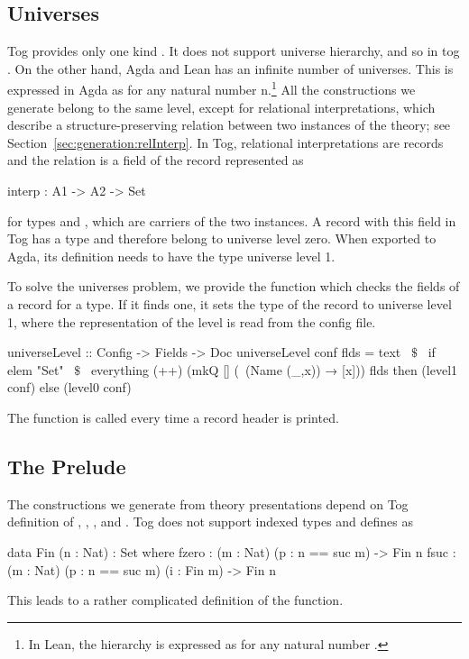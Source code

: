 \subsection{Universes}
Tog provides only one kind . It does not support universe hierarchy, and so in tog . On the other hand, Agda and Lean has an infinite number of universes. This is expressed in Agda as 
 for any natural number $\text{n}$.\footnote{In Lean, the hierarchy is expressed as  for any natural number .}
All the constructions we generate belong to the same level, except for relational interpretations, which describe a structure-preserving relation between two instances of the theory; see Section~\ref{sec:generation:relInterp}. In Tog, relational interpretations are records and the relation is a field of the record represented as 
\begin{togcode}
interp : A1 -> A2 -> Set
\end{togcode}
\noindent for types  and , which are carriers of the two instances. 
A record with this field in Tog has a type  and therefore belong to universe level zero. When exported to Agda, its definition needs to have the type universe level 1.  

To solve the universes problem, we provide the function  which checks the fields of a record for a  type. If it finds one, it sets the type of the record to universe level 1, where the representation of the level is read from the config file. 
\begin{hscode}
universeLevel :: Config -> Fields -> Doc
universeLevel conf flds =
  text ~$\$$~
    if elem "Set" ~$\$$~ everything (++) (mkQ [] (\ (Name (_,x)) → [x])) flds
    then (level1 conf) else (level0 conf)    
\end{hscode}
The function  is called every time a record header is printed. 

\subsection{The Prelude}
The constructions we generate from theory presentations depend on Tog definition of , , , and . Tog does not support indexed types and defines  as  
\begin{togcode}
data Fin (n : Nat) : Set where
  fzero : (m : Nat) (p : n == suc m) -> Fin n
  fsuc  : (m : Nat) (p : n == suc m) (i : Fin m) -> Fin n
\end{togcode}
\noindent This leads to a rather complicated definition of the  function. 

